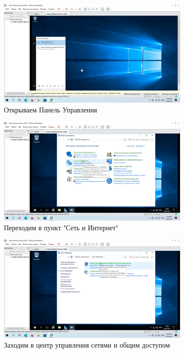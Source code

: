 \documentclass[a4paper]{article}
\begin{document}
  \begin{figure}[H]
    \centering
    \includegraphics[width=0.85\textwidth]{Screenshot_18}
    \caption{Открываем Панель Управления}
    \label{img:18}
  \end{figure}

  \begin{figure}[H]
    \centering
    \includegraphics[width=0.85\textwidth]{Screenshot_19}
    \caption{Переходим в пункт "Сеть и Интернет"}
    \label{img:19}
  \end{figure}

  \begin{figure}[H]
    \centering
    \includegraphics[width=0.85\textwidth]{Screenshot_20}
    \caption{Заходим в центр управления сетями и общим доступом}
    \label{img:20}
  \end{figure}
\end{document}

